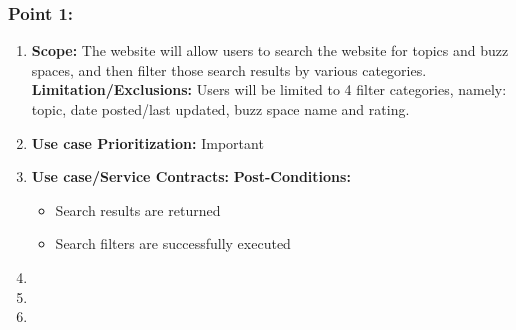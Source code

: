 \documentclass[11pt]{article}
\begin{document}
\subsubsection{Point 1: }
\begin{enumerate}
\item \textbf{Scope: }
The website will allow users to search the website for topics and buzz spaces, and then filter those search results by various categories. \newline \newline
	  \textbf{Limitation/Exclusions: }
Users will be limited to 4 filter categories, namely: topic, date posted/last updated, buzz space name and rating.
\item \textbf{Use case Prioritization: } Important
\item \textbf{Use case/Service Contracts: } \newline \newline
	  \textbf{Post-Conditions: }
	  \begin{itemize}
	  \item Search results are returned
	  \item	Search filters are successfully executed
	  \end{itemize}
	  \item
	  \item
	  \item
	  \end{enumerate}
	  
\end{document}
